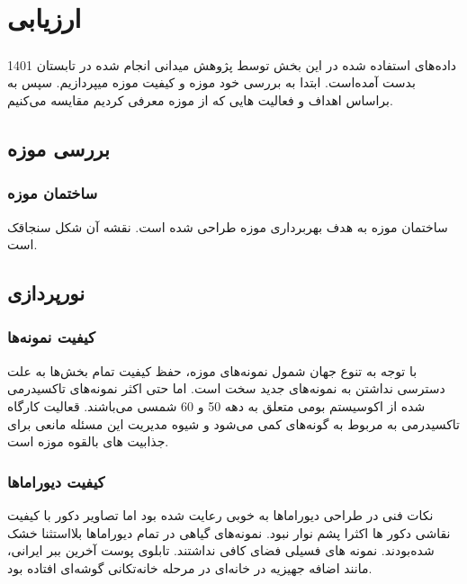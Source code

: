 
\chapter{ارزیابی} \label{chapter:evaluation}

\paragraph*{}
داده‌های استفاده شده در این بخش توسط پژوهش میدانی انجام شده در تابستان 1401 بدست آمده‌است.
ابتدا به بررسی خود موزه و کیفیت موزه میپردازیم.
سپس به براساس اهداف و فعالیت هایی که از موزه معرفی کردیم مقایسه می‌کنیم.

\section{بررسی موزه}

\subsection{ساختمان موزه}
ساختمان موزه به هدف بهربرداری موزه طراحی شده است. نقشه آن شکل سنجاقک است.

\section{نورپردازی}


\subsection{کیفیت نمونه‌ها}

با توجه به تنوع جهان شمول نمونه‌های موزه، حفظ کیفیت تمام بخش‌ها به علت دسترسی نداشتن به نمونه‌های جدید سخت است. اما حتی اکثر نمونه‌های تاکسیدرمی شده از اکوسیستم بومی  متعلق به دهه 50 و 60 شمسی می‌باشند. قعالیت کارگاه تاکسیدرمی به مربوط به گونه‌های کمی ‌می‌شود و شیوه مدیریت این مسئله مانعی برای جذابیت های بالقوه موزه است.

\subsection{کیفیت دیوراماها}

نکات فنی در طراحی دیوراماها به خوبی رعایت شده بود اما تصاویر دکور با کیفیت نقاشی دکور ها اکثرا پشم نوار نبود.
نمونه‌های گیاهی در تمام دیوراماها بلااستثنا خشک شده‌بودند.
نمونه های فسیلی فضای کافی نداشتند.
تابلوی پوست آخرین ببر ایرانی، مانند اضافه جهیزیه در خانه‌ای در مرحله خانه‌تکانی گوشه‌ای افتاده بود.